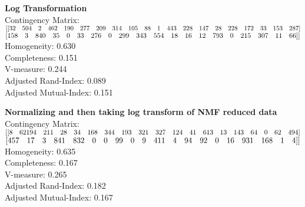 \documentclass{article}
\begin{document}
\textbf{Log Transformation}\\
Contingency Matrix:\\
$[[ 32\quad 504 \quad  2\quad 462\quad 190\quad 277 \quad209\quad314\quad 105\quad  88 \quad  1\quad 443\quad 228\quad 147\quad  28\quad 228\quad 172\quad  33\quad 153 \quad287]\\$
$[158\quad   3\quad 840\quad  35  \quad 0 \quad 33\quad 276\quad   0\quad 299 \quad343 \quad554 \quad 18  \quad16 \quad 12\quad 793 \quad  0\quad 215\quad 307\quad 11 \quad 66]]\\$
Homogeneity: 0.630\\
Completeness: 0.151\\
V-measure: 0.244\\
Adjusted Rand-Index: 0.089\\
Adjusted Mutual-Index: 0.151\\
\begin{figure}[h]
	\centering
	\qquad
\end{figure}

\textbf{Normalizing and then taking log transform of NMF reduced data}\\
Contingency Matrix:\\
$[[  8 \quad621  94\quad 211\quad  28\quad  34\quad 168\quad 344 \quad193\quad 321\quad 327\quad 124\quad 41\quad 613\quad  13\quad 143 \quad 64  \quad 0 \quad62\quad 494]\\$
$[457 \quad 17\quad   3 \quad841\quad 832 \quad  0 \quad  0\quad  99 \quad  0  \quad 9\quad 411 \quad  4 \quad 94\quad  92 \quad  0\quad  16\quad 931\quad 168\quad 1 \quad  4]]\\$
Homogeneity: 0.635\\
Completeness: 0.167\\
V-measure: 0.265\\
Adjusted Rand-Index: 0.182\\
Adjusted Mutual-Index: 0.167\\
\end{document}
